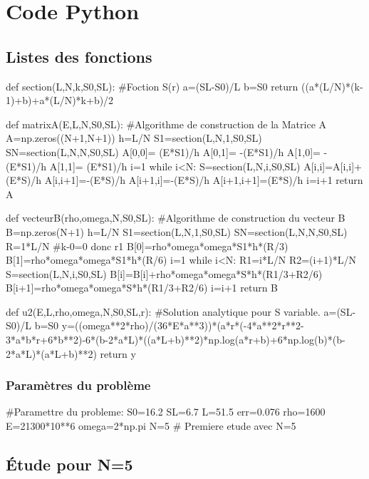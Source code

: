 \documentclass[a4paper,10pt]{report} %
\begin{document}
%
%
	

\appendix 
\chapter{Code Python}
\section{Listes des fonctions}


\begin{python}
def section(L,N,k,S0,SL): #Foction S(r)
    a=(SL-S0)/L
    b=S0
    return ((a*(L/N)*(k-1)+b)+a*(L/N)*k+b)/2


def matrixA(E,L,N,S0,SL): #Algorithme de construction de la Matrice A
    A=np.zeros((N+1,N+1))
    h=L/N
    S1=section(L,N,1,S0,SL)
    SN=section(L,N,N,S0,SL)
    A[0,0]= (E*S1)/h
    A[0,1]= -(E*S1)/h
    A[1,0]= -(E*S1)/h
    A[1,1]= (E*S1)/h
    i=1
    while i<N:
        S=section(L,N,i,S0,SL)
        A[i,i]=A[i,i]+(E*S)/h
        A[i,i+1]=-(E*S)/h
        A[i+1,i]=-(E*S)/h
        A[i+1,i+1]=(E*S)/h
        i=i+1
    return A

def vecteurB(rho,omega,N,S0,SL): #Algorithme de construction du vecteur B
    B=np.zeros(N+1)
    h=L/N
    S1=section(L,N,1,S0,SL)
    SN=section(L,N,N,S0,SL)
    R=1*L/N #k-0=0 donc r1
    B[0]=rho*omega*omega*S1*h*(R/3)
    B[1]=rho*omega*omega*S1*h*(R/6)
    i=1
    while i<N:
        R1=i*L/N
        R2=(i+1)*L/N
        S=section(L,N,i,S0,SL)
        B[i]=B[i]+rho*omega*omega*S*h*(R1/3+R2/6)
        B[i+1]=rho*omega*omega*S*h*(R1/3+R2/6)
        i=i+1
    return B

def u2(E,L,rho,omega,N,S0,SL,r): #Solution analytique pour S variable.
    a=(SL-S0)/L
    b=S0
    y=((omega**2*rho)/(36*E*a**3))*(a*r*(-4*a**2*r**2-3*a*b*r+6*b**2)-6*(b-2*a*L)*((a*L+b)**2)*np.log(a*r+b)+6*np.log(b)*(b-2*a*L)*(a*L+b)**2)
    return y
\end{python}

\subsection{Paramètres du problème}

\begin{python}
#Paramettre du probleme:
S0=16.2
SL=6.7
L=51.5
err=0.076
rho=1600
E=21300*10**6
omega=2*np.pi
N=5 # Premiere etude avec N=5
\end{python}

\section{Étude pour N=5}
\end{document}
